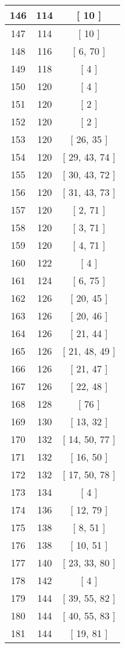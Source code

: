 \begin{center}
\begin{longtable}[H]{|| c c c ||}
\hline
146 & 114 & [ 10 ] \\ 
\hline
147 & 114 & [ 10 ] \\ 
\hline
148 & 116 & [ 6, 70 ] \\ 
\hline
149 & 118 & [ 4 ] \\ 
\hline
150 & 120 & [ 4 ] \\ 
\hline
151 & 120 & [ 2 ] \\ 
\hline
152 & 120 & [ 2 ] \\ 
\hline
153 & 120 & [ 26, 35 ] \\ 
\hline
154 & 120 & [ 29, 43, 74 ] \\ 
\hline
155 & 120 & [ 30, 43, 72 ] \\ 
\hline
156 & 120 & [ 31, 43, 73 ] \\ 
\hline
157 & 120 & [ 2, 71 ] \\ 
\hline
158 & 120 & [ 3, 71 ] \\ 
\hline
159 & 120 & [ 4, 71 ] \\ 
\hline
160 & 122 & [ 4 ] \\ 
\hline
161 & 124 & [ 6, 75 ] \\ 
\hline
162 & 126 & [ 20, 45 ] \\ 
\hline
163 & 126 & [ 20, 46 ] \\ 
\hline
164 & 126 & [ 21, 44 ] \\ 
\hline
165 & 126 & [ 21, 48, 49 ] \\ 
\hline
166 & 126 & [ 21, 47 ] \\ 
\hline
167 & 126 & [ 22, 48 ] \\ 
\hline
168 & 128 & [ 76 ] \\ 
\hline
169 & 130 & [ 13, 32 ] \\ 
\hline
170 & 132 & [ 14, 50, 77 ] \\ 
\hline
171 & 132 & [ 16, 50 ] \\ 
\hline
172 & 132 & [ 17, 50, 78 ] \\ 
\hline
173 & 134 & [ 4 ] \\ 
\hline
174 & 136 & [ 12, 79 ] \\ 
\hline
175 & 138 & [ 8, 51 ] \\ 
\hline
176 & 138 & [ 10, 51 ] \\ 
\hline
177 & 140 & [ 23, 33, 80 ] \\ 
\hline
178 & 142 & [ 4 ] \\ 
\hline
179 & 144 & [ 39, 55, 82 ] \\ 
\hline
180 & 144 & [ 40, 55, 83 ] \\ 
\hline
181 & 144 & [ 19, 81 ] \\ 

\end{longtable}
\end{center}
